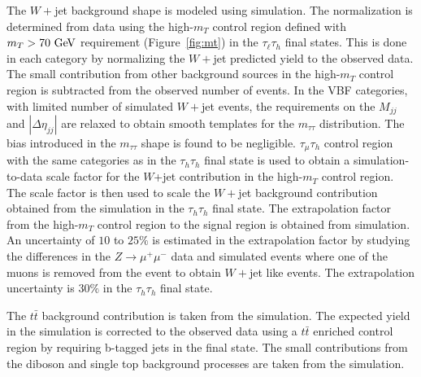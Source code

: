 The $W+$jet background shape is modeled using simulation. The normalization is determined from data using the high-$m_T$ control region defined with $m_{T}>70~\mathrm{Ge\kern -0.1em V}$ requirement (Figure~\ref{fig:mt}) in the $\tau_{\ell}\tau_h$ final states. This is done in each category by normalizing the $W+$jet predicted yield to the observed data. The small contribution from other background sources in the high-$m_T$ control region is subtracted from the observed number of events. In the VBF categories, with limited number of simulated $W+$jet events, the requirements on the $M_{jj}$ and $|\Delta \eta_{jj}|$ are relaxed to obtain smooth templates for the $m_{\tau\tau}$ distribution. The bias introduced in the $m_{\tau\tau}$ shape is found to be negligible. $\tau_{\mu}\tau_h$ control region with the same categories as in the $\tau_h\tau_h$ final state is used to obtain a simulation-to-data scale factor for the $W$+jet contribution in the high-$m_T$ control region. The scale factor is then used to scale the $W+$jet background contribution obtained from the simulation in the $\tau_h\tau_h$ final state. The extrapolation factor from the high-$m_{T}$ control region to the signal region is obtained from simulation. An uncertainty of $10$ to $25\%$ is estimated in the extrapolation factor by studying the differences in the $Z\rightarrow \mu^{+}\mu^{-}$ data and simulated events where one of the muons is removed from the event to obtain $W+$jet like events. The extrapolation uncertainty is $30\%$ in the $\tau_h\tau_h$ final state.

The $t\bar{t}$ background contribution is taken from the simulation. The expected yield in the simulation is corrected to the observed data using a $t\bar{t}$ enriched control region by requiring b-tagged jets in the final state. The small contributions from the diboson and single top background processes  are taken from the simulation. 

